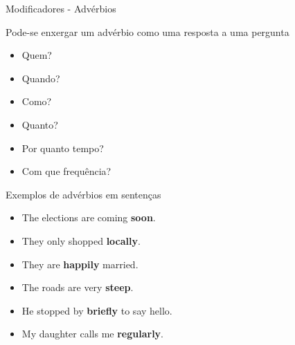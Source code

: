 \documentclass[compress,mathserif,xcolor=table]{beamer}
\begin{document}

\begin{frame}{Modificadores - Advérbios}

Pode-se enxergar um advérbio como uma resposta a uma pergunta
\begin{minipage}{.49\textwidth}
\begin{itemize}
    \item Quem?
    \item Quando?
    \item Como?
\end{itemize}
\end{minipage}
\begin{minipage}{.49\textwidth}
\begin{itemize}
    \item Quanto?
    \item Por quanto tempo?
    \item Com que frequência?
\end{itemize}
\end{minipage}

\vspace{0.5cm}

Exemplos de advérbios em sentenças

\begin{itemize}
    \item The elections are coming \textbf{soon}.
    \item They only shopped \textbf{locally}.
    \item They are \textbf{happily} married.
    \item The roads are very \textbf{steep}.
    \item He stopped by \textbf{briefly} to say hello.
    \item My daughter calls me \textbf{regularly}.
\end{itemize}
\end{frame}

\end{document}

